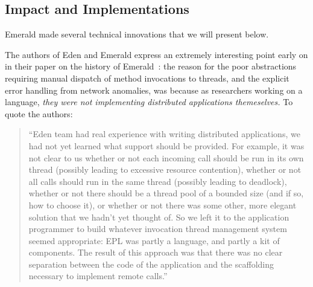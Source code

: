 \subsection{Impact and Implementations}

Emerald made several technical innovations that we will present below.







The authors of Eden and Emerald express an extremely interesting point early on in their paper on the history of Emerald~\cite{black2007development}: the reason for the poor abstractions requiring manual dispatch of method invocations to threads, and the explicit error handling from network anomalies, was because as researchers working on a language, \textit{they were not implementing distributed applications themeselves.}  To quote the authors:

\begin{quote}
``Eden team had real experience with writing distributed applications, we had not yet learned what support should be provided. For example, it was not clear to us whether or not each incoming call should be run in its own thread (possibly leading to excessive resource contention), whether or not all calls should run in the same thread (possibly leading to deadlock), whether or not there should be a thread pool of a bounded size (and if so, how to choose it), or whether or not there was some other, more elegant solution that we hadn’t yet thought of. So we left it to the application programmer to build whatever invocation thread management system seemed appropriate: EPL was partly a language, and partly a kit of components. The result of this approach was that there was no clear separation between the code of the application and the scaffolding necessary to implement remote calls.''	
\end{quote}




